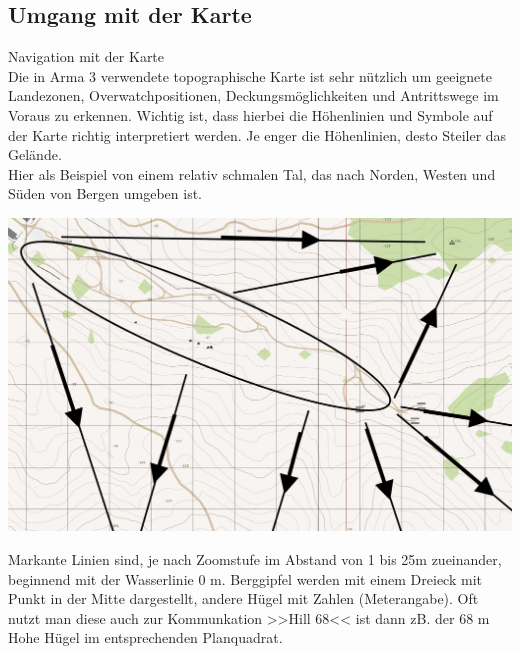 \pagebreak
\subsection{Umgang mit der Karte}

	Navigation mit der Karte \\

	Die in Arma 3 verwendete topographische Karte ist sehr nützlich um geeignete Landezonen, Overwatchpositionen, Deckungsmöglichkeiten und Antrittswege im Voraus zu erkennen. Wichtig ist, dass hierbei die Höhenlinien und Symbole auf der Karte richtig interpretiert werden. Je enger die Höhenlinien, desto Steiler das Gelände. \\

	Hier als Beispiel von einem relativ schmalen Tal, das nach Norden, Westen und Süden von Bergen umgeben ist. \\
\begin{minipage}[t]{1\textwidth}
	\centering
	\includegraphics[width=\textwidth]{../img/advanced/kartenarbeit/karte1}
\end{minipage}

	Markante Linien sind, je nach Zoomstufe im Abstand von 1 bis 25m zueinander, beginnend mit der Wasserlinie 0 m. Berggipfel werden mit einem Dreieck mit Punkt in der Mitte dargestellt, andere Hügel mit Zahlen (Meterangabe). Oft nutzt man diese auch zur Kommunkation >>Hill 68<< ist dann zB. der 68 m Hohe Hügel im entsprechenden Planquadrat. \\

